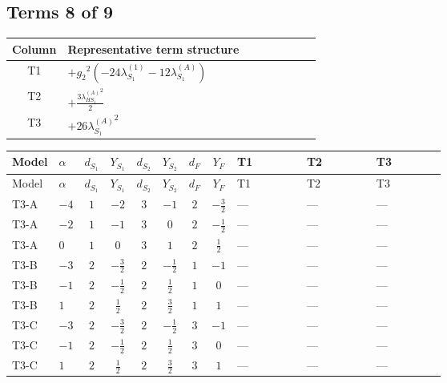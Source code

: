 \documentclass[8pt]{article}
\begin{document}
\begin{landscape}
\subsection*{Terms 8 of 9}
\begin{center}
\begin{tabular}{@{}c >{\raggedright\arraybackslash}p{0.82\linewidth}@{}}
\toprule
Column & Representative term structure \\
\midrule
T1 & \(\displaystyle +{g_2}^2 (-24 {\lambda_{S_1}^{(1)}}-12 {\lambda_{S_1}^{(A)}})\) \\
\midrule
T2 & \(\displaystyle +\frac{3 {\lambda_{HS_1}^{(A)}}^2}{2}\) \\
\midrule
T3 & \(\displaystyle +26 {\lambda_{S_1}^{(A)}}^2\) \\
\midrule
\bottomrule
\end{tabular}
\end{center}
\smallskip
\tiny
\begin{longtable}{@{}llcccccc >{\raggedright\arraybackslash}p{0.21\linewidth} >{\raggedright\arraybackslash}p{0.21\linewidth} >{\raggedright\arraybackslash}p{0.21\linewidth}@{}}
\toprule
Model & $\alpha$ & $d_{S_1}$ & $Y_{S_1}$ & $d_{S_2}$ & $Y_{S_2}$ & $d_F$ & $Y_F$ & T1 & T2 & T3 \\
\midrule
\endfirsthead
\toprule
Model & $\alpha$ & $d_{S_1}$ & $Y_{S_1}$ & $d_{S_2}$ & $Y_{S_2}$ & $d_F$ & $Y_F$ & T1 & T2 & T3 \\
\midrule
\endhead
T3-A & $-4$ & $1$ & $-2$ & $3$ & $-1$ & $2$ & $-\frac{3}{2}$ & --- & --- & --- \\
\midrule
T3-A & $-2$ & $1$ & $-1$ & $3$ & $0$ & $2$ & $-\frac{1}{2}$ & --- & --- & --- \\
\midrule
T3-A & $0$ & $1$ & $0$ & $3$ & $1$ & $2$ & $\frac{1}{2}$ & --- & --- & --- \\
\midrule
T3-B & $-3$ & $2$ & $-\frac{3}{2}$ & $2$ & $-\frac{1}{2}$ & $1$ & $-1$ & --- & --- & --- \\
\midrule
T3-B & $-1$ & $2$ & $-\frac{1}{2}$ & $2$ & $\frac{1}{2}$ & $1$ & $0$ & --- & --- & --- \\
\midrule
T3-B & $1$ & $2$ & $\frac{1}{2}$ & $2$ & $\frac{3}{2}$ & $1$ & $1$ & --- & --- & --- \\
\midrule
T3-C & $-3$ & $2$ & $-\frac{3}{2}$ & $2$ & $-\frac{1}{2}$ & $3$ & $-1$ & --- & --- & --- \\
\midrule
T3-C & $-1$ & $2$ & $-\frac{1}{2}$ & $2$ & $\frac{1}{2}$ & $3$ & $0$ & --- & --- & --- \\
\midrule
T3-C & $1$ & $2$ & $\frac{1}{2}$ & $2$ & $\frac{3}{2}$ & $3$ & $1$ & --- & --- & --- \\

\end{longtable}
\end{landscape}
\end{document}
